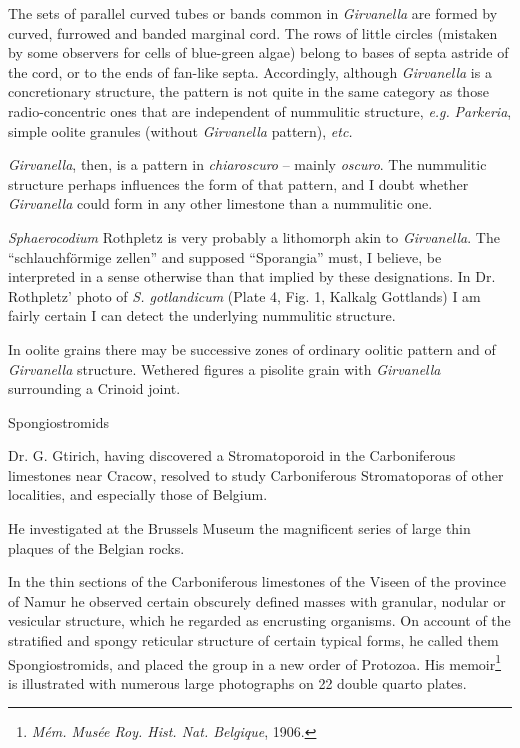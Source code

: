 \documentclass[a4paper, 12pt, oneside]{article}
\begin{document}
The sets of parallel curved tubes or bands common in \emph{Girvanella} are formed by curved, furrowed and banded marginal cord. The rows of little circles (mistaken by some observers for cells of blue-green algae) belong to bases of septa astride of the cord, or to the ends of fan-like septa. Accordingly, although \emph{Girvanella} is a concretionary structure, the pattern is not quite in the same category as those radio-concentric ones that are independent of nummulitic structure, \emph{e.g.} \emph{Parkeria}, simple oolite granules (without \emph{Girvanella} pattern), \emph{etc.}

\emph{Girvanella}, then, is a pattern in \emph{chiaroscuro} -- mainly \emph{oscuro}. The nummulitic structure perhaps influences the form of that pattern, and I doubt whether \emph{Girvanella} could form in any other limestone than a nummulitic one.

\emph{Sphaerocodium} Rothpletz is very probably a lithomorph akin to \emph{Girvanella}. The ``schlauchförmige zellen'' and supposed ``Sporangia'' must, I believe, be interpreted in a sense otherwise than that implied by these designations. In Dr. Rothpletz' photo of \emph{S. gotlandicum} (Plate 4, Fig. 1, Kalkalg Gottlands) I am fairly certain I can detect the underlying nummulitic structure.

In oolite grains there may be successive zones of ordinary oolitic pattern and of \emph{Girvanella} structure. Wethered figures a pisolite grain with \emph{Girvanella} surrounding a Crinoid joint.

Spongiostromids

Dr. G. Gtirich, having discovered a Stromatoporoid in the Carboniferous limestones near Cracow, resolved to study Carboniferous Stromatoporas of other localities, and especially those of Belgium.

He investigated at the Brussels Museum the magnificent series of large thin plaques of the Belgian rocks.

In the thin sections of the Carboniferous limestones of the Viseen of the province of Namur he observed certain obscurely defined masses with granular, nodular or vesicular structure, which he regarded as encrusting organisms. On account of the stratified and spongy reticular structure of certain typical forms, he called them Spongiostromids, and placed the group in a new order of Protozoa. His memoir\footnote{\emph{Mém. Musée Roy. Hist. Nat. Belgique}, 1906.} is illustrated with numerous large photographs on 22 double quarto plates.
\end{document}
